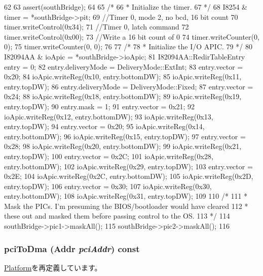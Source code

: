 \begin{DoxyCode}
62 {
63     assert(southBridge);
64 
65     /*
66      * Initialize the timer.
67      */
68     I8254 & timer = *southBridge->pit;
69     //Timer 0, mode 2, no bcd, 16 bit count
70     timer.writeControl(0x34);
71     //Timer 0, latch command
72     timer.writeControl(0x00);
73     //Write a 16 bit count of 0
74     timer.writeCounter(0, 0);
75     timer.writeCounter(0, 0);
76 
77     /*
78      * Initialize the I/O APIC.
79      */
80     I82094AA & ioApic = *southBridge->ioApic;
81     I82094AA::RedirTableEntry entry = 0;
82     entry.deliveryMode = DeliveryMode::ExtInt;
83     entry.vector = 0x20;
84     ioApic.writeReg(0x10, entry.bottomDW);
85     ioApic.writeReg(0x11, entry.topDW);
86     entry.deliveryMode = DeliveryMode::Fixed;
87     entry.vector = 0x24;
88     ioApic.writeReg(0x18, entry.bottomDW);
89     ioApic.writeReg(0x19, entry.topDW);
90     entry.mask = 1;
91     entry.vector = 0x21;
92     ioApic.writeReg(0x12, entry.bottomDW);
93     ioApic.writeReg(0x13, entry.topDW);
94     entry.vector = 0x20;
95     ioApic.writeReg(0x14, entry.bottomDW);
96     ioApic.writeReg(0x15, entry.topDW);
97     entry.vector = 0x28;
98     ioApic.writeReg(0x20, entry.bottomDW);
99     ioApic.writeReg(0x21, entry.topDW);
100     entry.vector = 0x2C;
101     ioApic.writeReg(0x28, entry.bottomDW);
102     ioApic.writeReg(0x29, entry.topDW);
103     entry.vector = 0x2E;
104     ioApic.writeReg(0x2C, entry.bottomDW);
105     ioApic.writeReg(0x2D, entry.topDW);
106     entry.vector = 0x30;
107     ioApic.writeReg(0x30, entry.bottomDW);
108     ioApic.writeReg(0x31, entry.topDW);
109 
110     /*
111      * Mask the PICs. I'm presuming the BIOS/bootloader would have cleared
112      * these out and masked them before passing control to the OS.
113      */
114     southBridge->pic1->maskAll();
115     southBridge->pic2->maskAll();
116 }
\end{DoxyCode}
\hypertarget{classPc_a87078b3d3a28ae134f6736337e90dac3}{
\subsubsection[{pciToDma}]{ pciToDma ({\bf Addr} {\em pciAddr}) const}}
\label{classPc_a87078b3d3a28ae134f6736337e90dac3}


\hyperlink{classPlatform_a87078b3d3a28ae134f6736337e90dac3}{Platform}を再定義しています。



